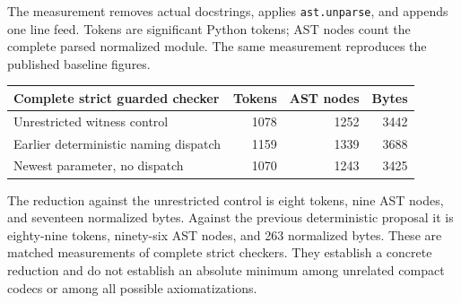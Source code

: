 The measurement removes actual docstrings, applies
\texttt{ast.unparse}, and appends one line feed.  Tokens are significant
Python tokens; AST nodes count the complete parsed normalized module.
The same measurement reproduces the published baseline figures.
\begin{center}
\begin{tabular}{lrrr}
\hline
Complete strict guarded checker & Tokens & AST nodes & Bytes\\
\hline
Unrestricted witness control & 1078 & 1252 & 3442\\
Earlier deterministic naming dispatch & 1159 & 1339 & 3688\\
Newest parameter, no dispatch & 1070 & 1243 & 3425\\
\hline
\end{tabular}
\end{center}
The reduction against the unrestricted control is eight tokens, nine
AST nodes, and seventeen normalized bytes.  Against the previous
deterministic proposal it is eighty-nine tokens, ninety-six AST nodes,
and 263 normalized bytes.  These are matched measurements of complete
strict checkers.  They establish a concrete reduction and do not
establish an absolute minimum among unrelated compact codecs or among
all possible axiomatizations.

